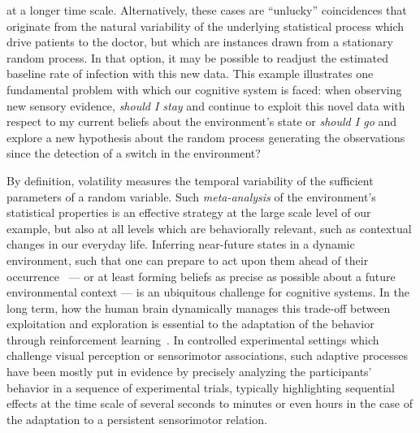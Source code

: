\documentclass[12pt,english]{article}%
\newcommand{\citep}[1]{\parencite{#1}}
\begin{document}
at a longer time scale.
Alternatively, these cases are
``unlucky'' coincidences that originate from the natural variability
of the underlying statistical process which drive patients to the doctor, 
but which are instances drawn from a stationary random process.
In that option, it may be possible to readjust
the estimated baseline rate of infection with this new data.
This example illustrates one fundamental problem
with which our cognitive system is faced:
when observing new sensory evidence,
\emph{should I stay} and continue to exploit this novel data
with respect to my current beliefs about the environment's state
or \emph{should I go} and explore a new hypothesis
about the random process generating the observations
since the detection of a switch in the environment?

By definition, volatility measures the temporal variability
of the sufficient parameters of a random variable.
Such \emph{meta-analysis} of the environment's statistical properties 
is an effective strategy at the large scale level of our example,
but also at all levels which are behaviorally relevant,
such as contextual changes in our everyday life.
Inferring near-future states in a dynamic environment, 
such that one can prepare to act upon them 
ahead of their occurrence~\citep{PerrinetAdamasFriston2014} ---
or at least forming beliefs as precise as possible
about a future environmental context ---
is an ubiquitous challenge for cognitive systems.
In the long term, how the human brain dynamically manages
this trade-off between exploitation and exploration
is essential to the adaptation
of the behavior through reinforcement learning~\citep{Cohen2007}.
In controlled experimental settings which challenge visual perception or sensorimotor associations,
such adaptive processes have been mostly put in evidence
by precisely analyzing the participants' behavior in a sequence of experimental trials,
typically highlighting sequential effects
at the time scale of several seconds to minutes 
or even hours in the case of the adaptation to a persistent sensorimotor relation.
\end{document}

